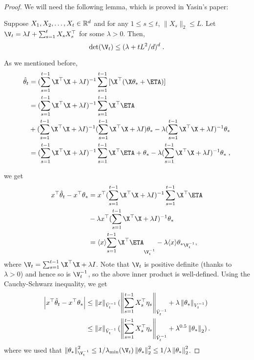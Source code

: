 \begin{proof}
We will need the following lemma, which is proved in Yasin's paper:

\begin{lemma}
\label{lemma:determinant-trace-inequality}
Suppose $X_1, X_2, \dots, X_t \in \mathbb{R}^d$ and for any $1 \le s \le t$, $\|X_s\|_2 \le L$.
Let $\V_t = \lambda I + \sum_{s=1}^t X_s X_s^\top$ for some $\lambda > 0$.
Then,
$$
\det(\V_t) \le (\lambda + tL^2/d)^d \; .
$$
\end{lemma}

As we mentioned before,
\begin{align*}
\hat{\theta}_t
&= (\sum_{s=1}^{t-1}{\X^\top \X} + \lambda I )^{-1} \sum_{s=1}^{t-1}{[\X^\top (\X \theta_* + \ETA)]} \\
&= (\sum_{s=1}^{t-1}{\X^\top \X} + \lambda I )^{-1} \sum_{s=1}^{t-1}{\X^\top \ETA} \\
&+ (\sum_{s=1}^{t-1}{\X^\top \X} + \lambda I )^{-1} (\sum_{s=1}^{t-1}{\X^\top \X+\lambda I}) \theta_* - \lambda (\sum_{s=1}^{t-1}{\X^\top \X} + \lambda I )^{-1}  \theta_* \\
&= (\sum_{s=1}^{t-1}{\X^\top \X} + \lambda I )^{-1} \sum_{s=1}^{t-1}{\X^\top \ETA} + \theta_* - \lambda (\sum_{s=1}^{t-1}{\X^\top \X} + \lambda I )^{-1}  \theta_* \; ,
\end{align*}

we get
\begin{align*}
x^\top \hat{\theta}_t - x^\top \theta_*
&= x^\top (\sum_{s=1}^{t-1}{\X^\top \X} + \lambda I )^{-1} \sum_{s=1}^{t-1}{\X^\top \ETA} \\
&- \lambda x^\top (\sum_{s=1}^{t-1}{\X^\top \X} + \lambda I )^{-1}  \theta_* \\
&= \ip{x}{\sum_{s=1}^{t-1}{\X^\top \ETA}}_{\V_t^{-1}} - \lambda \ip{x}{\theta_*}_{\V_t^{-1}},
\end{align*}
where $\V_t = \sum_{s=1}^{t-1}{\X^\top \X} + \lambda I $.
Note that $\V_t$ is positive definite (thanks to $\lambda>0$) and hence so is $\V_t^{-1}$, so the above inner product is well-defined.
Using the Cauchy-Schwarz inequality, we get
\begin{align*}
  \left|x^\top \hat{\mathbf{\theta}}_t - x^\top \theta_*\right|
  &\leq \left\|x\right\|_{\bar{V}_t^{-1}} (\left\|\sum_{s=1}^{t-1}{X_s^\top \mathbf{\eta}_s}\right\|_{\bar{V}_t^{-1}} + \lambda \left\|\theta_*\right\|_{V_t^{-1}}) \\
  &\leq \left\|x\right\|_{\bar{V}_t^{-1}} (\left\|\sum_{s=1}^{t-1}{X_s^\top \mathbf{\eta}_s}\right\|_{\bar{V}_t^{-1}} + \lambda^{0.5} \left\|\theta_*\right\|_2) \,.
\end{align*}
where we used that $\norm{\theta_*}_{\V_t^{-1}}^2 \le 1/\lambda_{\min}(\V_t) \norm{\theta_*}_2^2 \le 1/\lambda \norm{\theta_*}_2^2$.


\end{proof}
